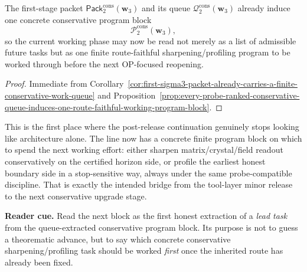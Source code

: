 \begin{corollary}
\label{cor:present-post-v3290-line-already-carries-a-first-concrete-conservative-working-program}
The first-stage packet \(\mathsf{Pack}^{\mathrm{cons}}_{2}(\mathbf w_3)\) and its queue \(\mathcal Q^{\mathrm{cons}}_{2}(\mathbf w_3)\) already induce one concrete conservative program block
\[
 \mathcal P^{\mathrm{cons}}_{2}(\mathbf w_3),
\]
so the current working phase may now be read not merely as a list of admissible future tasks but as one finite route-faithful sharpening/profiling program to be worked through before the next OP-focused reopening.
\end{corollary}

\begin{proof}
Immediate from Corollary~\ref{cor:first-sigma3-packet-already-carries-a-finite-conservative-work-queue} and Proposition~\ref{prop:every-probe-ranked-conservative-queue-induces-one-route-faithful-working-program-block}.
\end{proof}

\begin{remark}
\label{rem:what-this-first-concrete-program-block-now-buys}
This is the first place where the post-release continuation genuinely stops looking like architecture alone. The line now has a concrete finite program block on which to spend the next working effort: either sharpen matrix/crystal/field readout conservatively on the certified horizon side, or profile the earliest honest boundary side in a stop-sensitive way, always under the same probe-compatible discipline. That is exactly the intended bridge from the tool-layer minor release to the next conservative upgrade stage.
\end{remark}


\noindent\textbf{Reader cue.} Read the next block as the first honest extraction of a \emph{lead task} from the queue-extracted conservative program block. Its purpose is not to guess a theorematic advance, but to say which concrete conservative sharpening/profiling task should be worked \emph{first} once the inherited route has already been fixed.

